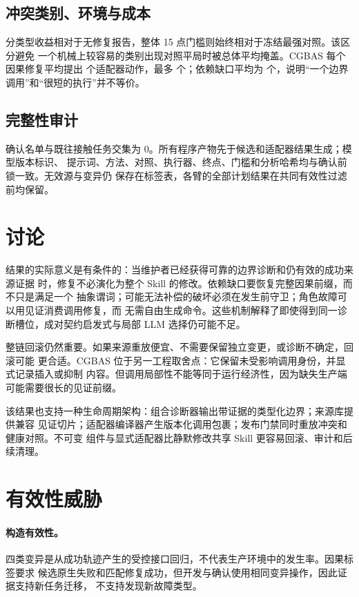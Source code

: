\documentclass[10pt]{article}
\begin{document}
\subsection{冲突类别、环境与成本}



分类型收益相对于无修复报告，整体 15 点门槛则始终相对于冻结最强对照。该区分避免
一个机械上较容易的类别出现对照平局时被总体平均掩盖。CGBAS 每个因果修复平均提出
\MeanAdapterActions{} 个适配器动作，最多 \MaxAdapterActions{} 个；依赖缺口平均为
\MeanRelyAdapterActions{} 个，说明“一个边界调用”和“很短的执行”并不等价。

\subsection{完整性审计}


确认名单与既往接触任务交集为 0。所有程序产物先于候选和适配器结果生成；模型版本标识、
提示词、方法、对照、执行器、终点、门槛和分析哈希均与确认前锁一致。无效源与变异仍
保存在标签表，各臂的全部计划结果在共同有效性过滤前均保留。

\section{讨论}

结果的实际意义是有条件的：当维护者已经获得可靠的边界诊断和仍有效的成功来源证据
时，修复不必演化为整个 Skill 的修改。依赖缺口要恢复完整因果前缀，而不只是满足一个
抽象谓词；可能无法补偿的破坏必须在发生前守卫；角色故障可以用见证消费调用修复，而
无需自由生成命令。这些机制解释了即使得到同一诊断槽位，成对契约启发式与局部 LLM
选择仍可能不足。

整链回滚仍然重要。如果来源重放便宜、不需要保留独立变更，或诊断不确定，回滚可能
更合适。CGBAS 位于另一工程取舍点：它保留未受影响调用身份，并显式记录插入或抑制
内容。但调用局部性不能等同于运行经济性，因为缺失生产端可能需要很长的见证前缀。

该结果也支持一种生命周期架构：组合诊断器输出带证据的类型化边界；来源库提供兼容
见证切片；适配器编译器产生版本化调用包裹；发布门禁同时重放冲突和健康对照。不可变
组件与显式适配器比静默修改共享 Skill 更容易回滚、审计和后续清理。

\section{有效性威胁}

\paragraph{构造有效性。}
四类变异是从成功轨迹产生的受控接口回归，不代表生产环境中的发生率。因果标签要求
候选原生失败和匹配修复成功，但开发与确认使用相同变异操作，因此证据支持新任务迁移，
不支持发现新故障类型。
\end{document}
